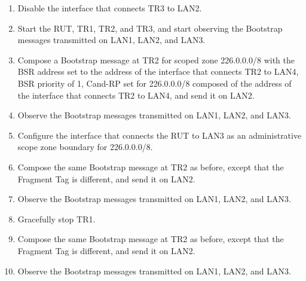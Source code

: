 \documentclass[11pt]{report}
\begin{document}
\begin{enumerate}

  \item Disable the interface that connects TR3 to LAN2.

  \item Start the RUT, TR1, TR2, and TR3, and start observing the Bootstrap
  messages transmitted on LAN1, LAN2, and LAN3.

  \item Compose a Bootstrap message at TR2 for scoped zone 226.0.0.0/8 with
  the BSR address set to the address of the interface that connects TR2 to
  LAN4, BSR priority of 1, Cand-RP set for 226.0.0.0/8 composed of the
  address of the interface that connects TR2 to LAN4, and send it on LAN2.

  \item Observe the Bootstrap messages transmitted on LAN1, LAN2, and LAN3.

  \item Configure the interface that connects the RUT to LAN3 as an
  administrative scope zone boundary for 226.0.0.0/8.

  \item Compose the same Bootstrap message at TR2 as before, except that the
  Fragment Tag is different, and send it on LAN2.

  \item Observe the Bootstrap messages transmitted on LAN1, LAN2, and LAN3.

  \item Gracefully stop TR1.

  \item Compose the same Bootstrap message at TR2 as before, except that the
  Fragment Tag is different, and send it on LAN2.

  \item Observe the Bootstrap messages transmitted on LAN1, LAN2, and LAN3.

\end{enumerate}

\end{document}
